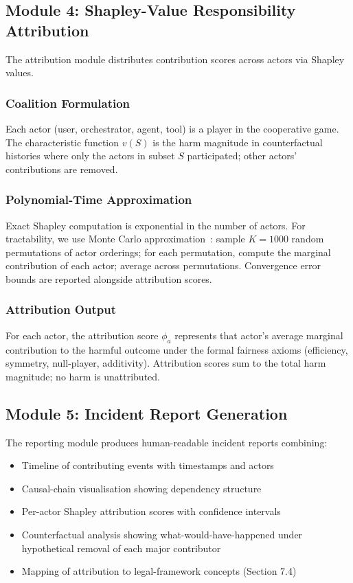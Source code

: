\documentclass[sigconf,nonacm]{acmart}
\begin{document}
\subsection{Module 4: Shapley-Value Responsibility Attribution}

The attribution module distributes contribution scores across
actors via Shapley values.

\subsubsection{Coalition Formulation}

Each actor (user, orchestrator, agent, tool) is a player in the
cooperative game. The characteristic function $v(S)$ is the harm
magnitude in counterfactual histories where only the actors in
subset $S$ participated; other actors' contributions are removed.

\subsubsection{Polynomial-Time Approximation}

Exact Shapley computation is exponential in the number of actors.
For tractability, we use Monte Carlo
approximation~\cite{jia2024approxshap}: sample $K = 1000$ random
permutations of actor orderings; for each permutation, compute the
marginal contribution of each actor; average across permutations.
Convergence error bounds are reported alongside attribution
scores.

\subsubsection{Attribution Output}

For each actor, the attribution score $\phi_a$ represents that
actor's average marginal contribution to the harmful outcome under
the formal fairness axioms (efficiency, symmetry, null-player,
additivity). Attribution scores sum to the total harm magnitude;
no harm is unattributed.

\subsection{Module 5: Incident Report Generation}

The reporting module produces human-readable incident reports
combining:

\begin{itemize}
  \item Timeline of contributing events with timestamps and actors
  \item Causal-chain visualisation showing dependency structure
  \item Per-actor Shapley attribution scores with confidence
        intervals
  \item Counterfactual analysis showing what-would-have-happened
        under hypothetical removal of each major contributor
  \item Mapping of attribution to legal-framework concepts
        (Section 7.4)
\end{itemize}
\end{document}
